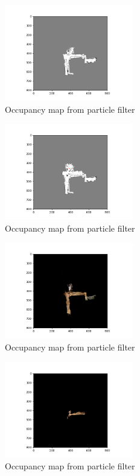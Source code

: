 \documentclass[a4paper]{article}
\begin{document}
\begin{figure}[h]
    \centering
    \includegraphics[width=0.5\textwidth]{map4000.png}
    \caption{Occupancy map from particle filter}
    \label{fig:particle_filter}
\end{figure}
\begin{figure}[h]
    \centering
    \includegraphics[width=0.5\textwidth]{map4800.png}
    \caption{Occupancy map from particle filter}
    \label{fig:particle_filter}
\end{figure}
\begin{figure}[h]
    \centering
    \includegraphics[width=0.5\textwidth]{texture0.png}
    \caption{Occupancy map from particle filter}
    \label{fig:particle_filter}
\end{figure}
\begin{figure}[h]
    \centering
    \includegraphics[width=0.5\textwidth]{texture_500.png}
    \caption{Occupancy map from particle filter}
    \label{fig:particle_filter}
\end{figure}
\end{document}
